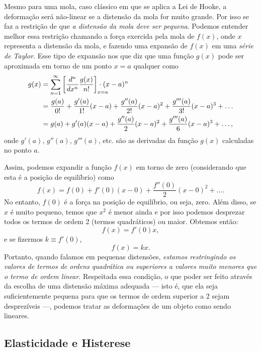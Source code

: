 Mesmo para uma mola, caso clássico em que se aplica a Lei de Hooke, a deformação será não-linear se a distensão da mola for muito grande. Por isso se faz a restrição de que \emph{a distensão da mola deve ser pequena}. Podemos entender melhor essa restrição chamando a força exercida pela mola de $f(x)$, onde $x$ representa a distensão da mola, e fazendo uma expansão de $f(x)$ em uma \emph{série de Taylor}. Esse tipo de expansão nos que diz que uma função $g(x)$ pode ser aproximada em torno de um ponto $x=a$ qualquer como
\begin{align}
	g(x) &= \sum_{n=1}^\infty \left[\frac{d^n}{dx^n}\frac{g(x)}{n!}\right]_{\mathrlap{x=a}}\cdot (x-a)^n \\
	&= \frac{g(a)}{0!} + \frac{g'(a)}{1!}(x - a) + \frac{g''(a)}{2!}(x-a)^2 + \frac{g'''(a)}{3!}(x-a)^3 + \dots \\
	&= g(a) + g'(a)(x-a) + \frac{g''(a)}{2}(x-a)^2 + \frac{g'''(a)}{6}(x-a)^3 + \dots,
\end{align}
%
onde $g'(a)$, $g''(a)$, $g'''(a)$, etc. são as derivadas da função $g(x)$ calculadas no ponto $a$.

Assim, podemos expandir a função $f(x)$ em torno de zero (considerando que esta é a posição de equilíbrio) como
\begin{equation}
	f(x) = f(0) + f'(0) (x-0) + \frac{f''(0)}{2}(x-0)^2 + \dots.
\end{equation}
%
No entanto, $f(0)$ é a força na posição de equilíbrio, ou seja, zero. Além disso, se $x$ é muito pequeno, temos que $x^2$ é menor ainda e por isso podemos desprezar todos os termos de ordem 2 (termos quadráticos) ou maior. Obtemos então:
\begin{equation}
	f(x) = f'(0)x,
\end{equation}
%
e se fizermos $k \equiv f'(0)$,
\begin{equation}
	f(x) = kx.
\end{equation}
%
Portanto, quando falamos em pequenas distensões, \emph{estamos restringindo os valores de termos de ordens quadrática ou superiores a valores muito menores que o termo de ordem linear}. Respeitada essa condição, o que poder ser feito através da escolha de uma distensão máxima adequada --- isto é, que ela seja suficientemente pequena para que os termos de ordem superior a 2 sejam desprezíveis ---, podemos tratar as deformações de um objeto como sendo lineares.

\subsection{Elasticidade e Histerese}

